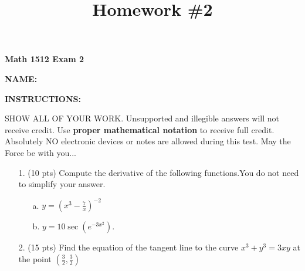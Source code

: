 \documentclass[11pt,reqno]{article}
\title{Homework \#2}
\theoremstyle{definition}
\begin{document}
\centerline{\textbf{\Large{Math 1512 Exam 2}}}

\vspace{0.12in}

\textbf{NAME:}\hrulefill

\vspace{0.2in}


\textbf{INSTRUCTIONS:}

SHOW ALL OF YOUR WORK. Unsupported and illegible answers will not receive credit. Use\textbf{ proper mathematical notation} to receive full credit.
Absolutely NO electronic devices or notes are allowed during this test. May the Force be with you...
	
	\begin{enumerate}
		\item[1.] (10 pts) Compute the derivative of the following functions.You do not need to simplify your answer. 
		\begin{enumerate}
			\item[a.] $y = \left(x^3 - \frac{7}{x}\right)^{-2}$
			\vspace{8cm} 
			\item[b.] $y = 10 \sec(e^{-3x^2})$. 
		\end{enumerate}
	\newpage
	\item[2.] (15 pts) Find the equation of the tangent line to the curve $x^3 + y^3 = 3xy$ at the point $\left(\frac{3}{2}, \frac{3}{2}\right)$ 
		
		
		
		
		
		
		
		
		
		
		
		\newpage 
		

\end{enumerate}
\end{document}
